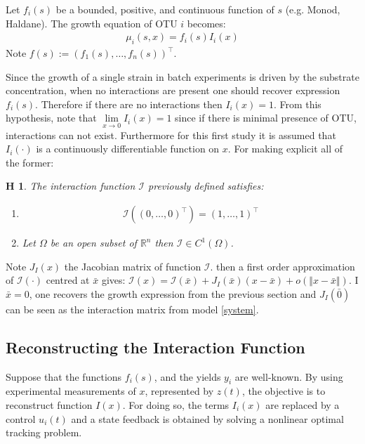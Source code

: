 \documentclass[3p,times]{elsarticle}
\newcommand{\R}{\mathbb{R}}
\newcommand{\I}{\mathcal{I}}
\newtheorem{hypo}{H}
\begin{document}
	Let $f_i(s)$ be a bounded, positive, and continuous function of $s$ (e.g. Monod, Haldane). The growth equation of OTU $i$ becomes:
	\begin{align}
	\mu_i(s,x) = f_i(s)I_i(x)
	\end{align}
	Note $f(s) := (f_1(s),\dots,f_n(s))^\top$.
	\label{growthForm}

Since the growth of a single strain in batch experiments is driven by the substrate concentration, when no interactions are present one should recover expression $f_i(s)$. Therefore if there are no interactions then $I_i(x) = 1$. From this hypothesis, note that $ \lim \limits_{x \rightarrow 0} I_i(x) = 1$ since if there is minimal presence of OTU, interactions can not exist. Furthermore for this first study it is assumed that $I_i(\cdot)$ is a continuously differentiable function on $x$. For making explicit all of the former:

\begin{hypo}
	The interaction function $\I$ previously defined satisfies:
	\begin{enumerate}
		\item\begin{align}
		\I \left( (0,\dots,0)^\top \right) = 
		(1,\dots,1)^\top 
		\end{align}
		\item Let $\Omega$ be an open subset of $ \R^n $ then $\I \in C^1(\Omega)$.
	\end{enumerate} 
\end{hypo}


Note $J_I(x)$ the Jacobian matrix of function $\mathcal{I}$. then a first order approximation of $\I(\cdot)$ centred at $\bar{x}$ gives: $\I(x) = \I(\bar{x}) + J_I(\bar{x})(x-\bar{x}) + o(\Vert x- \bar{x} \Vert)$. I $\bar{x}= 0$, one recovers the growth expression from the previous section and $J_I(\bar{0})$ can be seen as the interaction matrix from model \eqref{system}.

\subsection{Reconstructing the Interaction Function}

Suppose that the functions $f_i(s)$, and the yields $y_i$ are well-known. By using experimental measurements of $x$, represented by $z(t)$, the objective is to reconstruct function $I(x)$. For doing so, the terms $I_i(x)$ are replaced by a control $u_i(t)$  and a state feedback is obtained by solving a nonlinear optimal tracking problem.	
\end{document}
